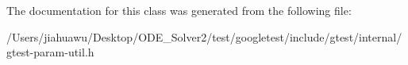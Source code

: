 The documentation for this class was generated from the following file\+:\begin{DoxyCompactItemize}
\item 
/\+Users/jiahuawu/\+Desktop/\+O\+D\+E\+\_\+\+Solver2/test/googletest/include/gtest/internal/gtest-\/param-\/util.\+h\end{DoxyCompactItemize}
